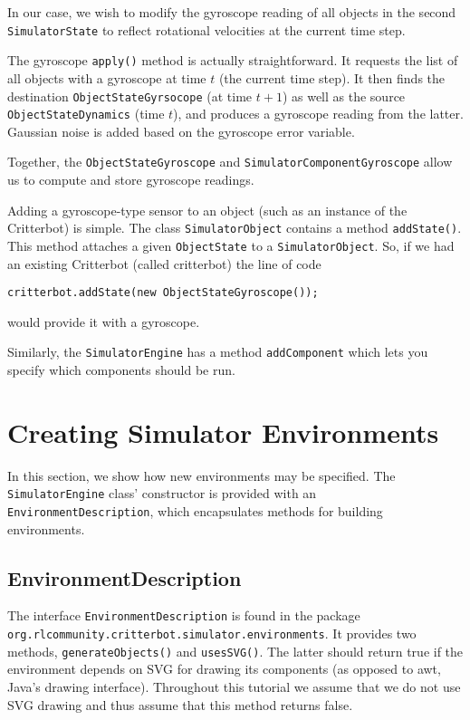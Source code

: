 \documentclass[12pt]{article}
\newcommand{\code}[1]{\texttt{#1}}
\begin{document}
In our case, we wish to modify the gyroscope reading of all
objects in the second \code{SimulatorState} to reflect rotational velocities
at the current time step. 

The gyroscope \code{apply()} method is actually straightforward. It requests
the list of all objects with a gyroscope at time $t$ (the current time step).
It then finds the destination \code{ObjectStateGyrsocope} (at time $t+1$)
as well as the source \code{ObjectStateDynamics} (time $t$), and produces a 
gyroscope reading from the latter. Gaussian noise is added based on the
gyroscope error variable.

Together, the \code{ObjectStateGyroscope} and 
\code{SimulatorComponentGyroscope} allow us to compute and store gyroscope
readings. 

Adding a gyroscope-type sensor to an object (such as an instance of
the Critterbot) is simple. The class \code{SimulatorObject} contains a method
\code{addState()}. This method attaches a given \code{ObjectState} to a
\code{SimulatorObject}. So, if we had an existing Critterbot (called critterbot)
the line of code

\begin{verbatim}
critterbot.addState(new ObjectStateGyroscope());
\end{verbatim}

would provide it with a gyroscope.

Similarly, the \code{SimulatorEngine} has a method \code{addComponent} which
lets you specify which components should be run.


\section{Creating Simulator Environments}

In this section, we show how new environments may be specified. The 
\code{SimulatorEngine} class' constructor is provided with an 
\code{EnvironmentDescription}, which encapsulates methods for building
environments.

\subsection{EnvironmentDescription}

The interface \code{EnvironmentDescription} is found in the package
\code{org.rlcommunity.critterbot.simulator.environments}. It provides two 
methods, 
\code{generateObjects()} and \code{usesSVG()}. The latter should return true
if the environment depends on SVG for drawing its components (as opposed to
awt, Java's drawing interface). Throughout this tutorial we assume that 
we do not use SVG drawing and thus assume that this method returns false.
\end{document}
